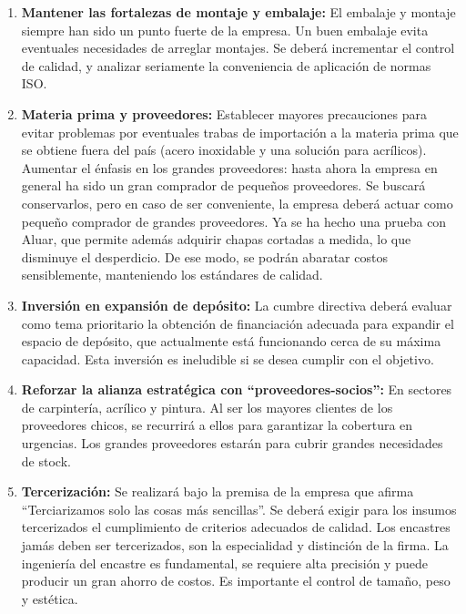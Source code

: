 \documentclass[a4paper,10pt,titlepage]{article}
\begin{document}
\begin{enumerate}
\item \textbf{Mantener las fortalezas de montaje y embalaje:} El embalaje y montaje siempre han sido un punto fuerte de la empresa. Un buen embalaje evita eventuales necesidades de arreglar montajes. Se deber\'a incrementar el control de calidad, y analizar seriamente la conveniencia de aplicaci\'on de normas ISO.

\item \textbf{Materia prima y proveedores:} Establecer mayores precauciones para evitar problemas por eventuales trabas de importaci\'on a la materia prima que se obtiene fuera del pa\'is (acero inoxidable y una soluci\'on para acr\'ilicos). Aumentar el \'enfasis en los grandes proveedores: hasta ahora la empresa en general ha sido un gran comprador de peque\~nos proveedores. Se buscar\'a conservarlos, pero en caso de ser conveniente, la empresa deber\'a actuar como peque\~no comprador de grandes proveedores. Ya se ha hecho una prueba con Aluar, que permite además adquirir chapas cortadas a medida, lo que disminuye el desperdicio. De ese modo, se podr\'an abaratar costos sensiblemente, manteniendo los est\'andares de calidad.

\item \textbf{Inversi\'on en expansi\'on de dep\'osito:} La cumbre directiva deber\'a evaluar como tema prioritario la obtenci\'on de financiaci\'on adecuada para expandir el espacio de dep\'osito, que actualmente está funcionando cerca de su m\'axima capacidad. Esta inversi\'on es ineludible si se desea cumplir con el objetivo.

\item \textbf{Reforzar la alianza estrat\'egica con ``proveedores-socios'':} En sectores de carpinter\'ia, acr\'ilico y pintura. Al ser los mayores clientes de los proveedores chicos, se recurrir\'a a ellos para garantizar la cobertura en urgencias. Los grandes proveedores estar\'an para cubrir grandes necesidades de stock.

\item \textbf{Tercerizaci\'on:} Se realizar\'a bajo la premisa de la empresa que afirma ``Terciarizamos solo las cosas m\'as sencillas''. Se deber\'a exigir para los insumos tercerizados el cumplimiento de criterios adecuados de calidad. Los encastres jam\'as deben ser tercerizados, son la especialidad y distinci\'on de la firma. La ingenier\'ia del encastre es fundamental, se requiere alta precisi\'on y puede producir un gran ahorro de costos. Es importante el control de tama\~no, peso y est\'etica.


\end{enumerate}
\end{document}
